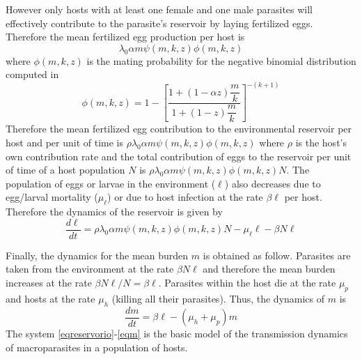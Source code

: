 \documentclass[eng]{MMSB-class-eng}
\begin{document}
However only hosts with at least one female and one male parasites will effectively contribute to the parasite's reservoir by laying fertilized eggs. Therefore the mean fertilized egg production per host is 
\begin{equation}\label{meanfertilizedeggs}
\lambda_0
\alpha m
\psi(m,k,z)\phi(m,k,z)
\end{equation} 
where $\phi(m,k,z)$ is the mating probability for the negative binomial distribution computed in \citet{lopez2022general}
\begin{equation}
\phi(m,k,z)=1-\left[ \frac{1+ \left( 1-
	\alpha z
	\right) \dfrac{m}{k}}{1+(1-z)\dfrac{m}{k}}\right] ^{-(k+1)}
\end{equation}
Therefore the mean fertilized egg contribution to the environmental reservoir  per host and per unit of time is
$\rho\lambda_0
\alpha m
\psi(m,k,z) \phi(m,k,z)$ where $\rho$ 
is the host's own contribution rate and the total contribution of eggs to the reservoir per unit of time of a host population $N$ is 
$\rho\lambda_0
\alpha m
\psi(m,k,z) \phi(m,k,z) N$. 
The population of eggs or larvae in the environment ($\ell$) also decreases due to egg/larval mortality ($\mu_{\ell}$) or due to host infection at the rate $\beta \ell$ per host. 
Therefore the dynamics of the reservoir is given by
\begin{equation}\label{eqreservorio}
\dfrac{d\ell}{dt}= \rho\lambda_0
\alpha m
\psi(m,k,z) \phi(m,k,z) N- \mu_{\ell} \ell -\beta N \ell 
\end{equation}

Finally, the dynamics for the mean burden $m$ is obtained as follow. Parasites are taken from the environment at the rate 	$\beta N \ell $ and therefore the mean burden increases at the rate  $\beta  N\ell/N=\beta\ell $. Parasites within the host die at the rate $\mu_p$ and hosts at the rate $\mu_h$ (killing all their parasites). Thus, the dynamics of $m$ is
\begin{equation}\label{eqm}
\dfrac{dm}{dt}=\beta \ell - (\mu_h+\mu_p)m
\end{equation}
The system \eqref{eqreservorio}-\eqref{eqm} is the basic model of the transmission dynamics of macroparasites in a population of hosts. 
\end{document}
